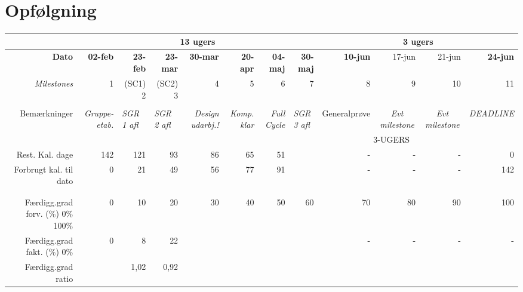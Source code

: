 \section{Opfølgning}

\begin{sidewaystable}[!htbp]
\begin{scriptsize}
    \begin{tabular}{r|rrrrrrr|rrrr}
    & \multicolumn{7}{c|}{13 ugers} & \multicolumn{4}{c}{3 ugers} \\ \hline
    \textbf{Dato} & \textbf{02-feb} & \textbf{23-feb} & \textbf{23-mar} & \textbf{30-mar} & \textbf{20-apr} & \textbf{04-maj} & \textbf{30-maj} & \textbf{10-jun} & 17-jun & 21-jun & \textbf{24-jun} \\
    \textit{Milestones} & 1     & (SC1) 2 & (SC2) 3 & 4     & 5     & 6     & 7     & 8     & 9     & 10    & 11 \\
          &       &       &       & \textit{} & \textit{} & \textit{} & \textit{} & \textit{} & \textit{} & \textit{} &  \\
    Bemærkninger & \textit{Gruppe-etab.} & \multicolumn{1}{l}{\textit{SGR 1 afl}} & \multicolumn{1}{l}{\textit{SGR 2 afl}} & \textit{Design udarbj.!} & \textit{Komp. klar} & \textit{Full Cycle} & \multicolumn{1}{l}{\textit{SGR 3 afl}} & \multicolumn{1}{c}{Generalprøve} & \multicolumn{1}{c}{\textit{Evt milestone}} & \multicolumn{1}{c}{\textit{Evt milestone}} & \multicolumn{1}{c}{\textit{DEADLINE}} \\
          &       &       &       &       &       &       &       & \multicolumn{3}{c}{3-UGERS} &  \\
    Rest. Kal. dage & 142   & 121   & 93    & 86    & 65    & 51    &       & -     & -     & -     & 0 \\
    Forbrugt kal. til dato & 0     & 21    & 49    & 56    & 77    & 91    &       & -     & -     & -     & 142 \\
          &       &       &       &       &       &       &       &       &       &       &  \\
          &       &       &       &       &       &       &       &       &       &       &  \\
    Færdigg.grad forv. (\%) 0\% 100\% & 0     & 10    & 20    & 30    & 40    & 50    & 60    & 70    & 80    & 90    & 100 \\
    Færdigg.grad fakt. (\%) 0\% & 0     & 8     & 22    &       &       &       &       & -     & -     & -     & - \\
    Færdigg.grad ratio &       & 1,02  & 0,92  &       &       &       &       &       &       &       &  \\

\end{tabular}
\end{scriptsize}
\end{sidewaystable}
